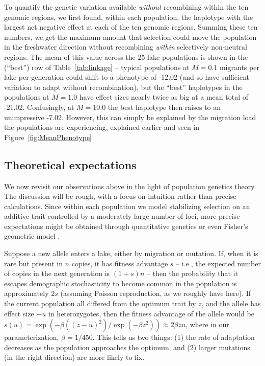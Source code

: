 \documentclass{article}
\begin{document}
To quantify the genetic variation available \emph{without} recombining within the ten genomic regions,
we first found, within each population, the haplotype with the largest net negative effect
at each of the ten genomic regions.
Summing these ten numbers, 
we get the maximum amount that selection could move the population in the freshwater direction
without recombining \emph{within} selectively non-neutral regions.
The mean of this value across the 25 lake populations is shown 
in the (``best'') row of Table~\ref{tab:linkage} --
typical populations at $M=0.1$ migrants per lake per generation could shift to a phenotype of -12.02
(and so have sufficient variation to adapt without recombination),
but the ``best'' haplotypes in the populations at $M=1.0$ have effect sizes nearly twice as big at a mean total of -21.02.
Confusingly, at $M=10.0$ the best haplotype then raises to an unimpressive -7.02.
However, this can simply be explained by the migration load the populations are experiencing, explained earlier and seen in Figure~\ref{fig:MeanPhenotype}

\subsection*{Theoretical expectations}

We now revisit our observations above
in the light of population genetics theory.
The discussion will be rough,
with a focus on intuition rather than precise calculations.
Since within each population we model stabilizing selection on an additive trait
controlled by a moderately large number of loci,
more precise expectations might be obtained through quantitative genetics \citep{svardal2014general}
or even Fisher's geometric model \citep{barton2001hybridization,chevin2014niche}.

Suppose a new allele enters a lake, either by migration or mutation. 
If, when it is rare but present in $n$ copies, it has fitness advantage $s$ 
-- i.e., the expected number of copies in the next generation is $(1+s)n$ 
-- then the probability that it escapes demographic stochasticity to become common in the population 
is approximately $2s$ \citep{lambert2006probability,haldane1927mathematical}
(assuming Poisson reproduction, as we roughly have here).
If the current population all differed from the optimum trait by $z$, 
and the allele has effect size $-u$ in heterozygotes, 
then the fitness advantage of the allele would be $s(u) = \exp(-\beta((z - u)^2) / \exp( - \beta z^2)) \approx 2 \beta z u$, where in our parameterization, $\beta = 1 / 450$. 
This tells us two things: (1) the rate of adaptation decreases as the population approaches the optimum, and (2) larger mutations (in the right direction) are more likely to fix.
\end{document}
